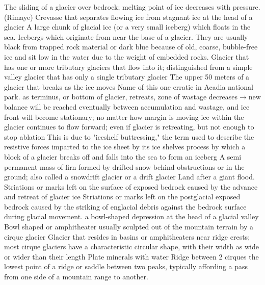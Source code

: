  The sliding of a glacier over bedrock; melting point of ice decreases with pressure.
 (Rimaye) Crevasse that separates flowing ice from stagnant ice at the head of a glacier
 A large chunk of glacial ice (or a very small iceberg) which floats in the sea.
 Icebergs which originate from near the base of a glacier. They are usually black from trapped rock material or dark blue because of old, coarse, bubble-free ice and sit low in the water due to the weight of embedded rocks.
 Glacier that has one or more tributary glaciers that flow into it; distinguished from a simple valley glacier that has only a single tributary glacier
 The upper 50 meters of a glacier that breaks as the ice moves
 Name of this one erratic in Acadia national park.
 as terminus, or bottom of glacier, retreats, zone of wastage decreases$ \rightarrow $new balance will be reached eventually between accumulation and wastage, and ice front will become stationary; no matter how margin is moving ice within the glacier continues to flow forward; even if glacier is retreating, but not enough to stop ablation
 This is due to "iceshelf buttressing," the term used to describe the resistive forces imparted to the ice sheet by its ice shelves
 process by which a block of a glacier breaks off and falls into the sea to form an iceberg
 A semi permanent mass of firn formed by drifted snow behind obstructions or in the ground; also called a snowdrift glacier or a drift glacier
 Land after a giant flood.
 Striations or marks left on the surface of exposed bedrock caused by the advance and retreat of glacier ice
 Striations or marks left on the postglacial exposed bedrock caused by the striking of englacial debris against the bedrock surface during glacial movement.
 a bowl-shaped depression at the head of a glacial valley
 Bowl shaped or amphitheater usually sculpted out of the mountain terrain by a cirque glacier
 Glacier that resides in basins or amphitheaters near ridge crests; most cirque glaciers have a characteristic circular shape, with their width as wide or wider than their length
 Plate minerals with water
 Ridge between 2 cirques
 the lowest point of a ridge or saddle between two peaks, typically affording a pass from one side of a mountain range to another.
